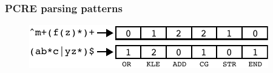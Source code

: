 {\begin{frame}

\end{frame}
}


%



 \begin{frame}
 \frametitle{PCRE parsing patterns}
 \begin{figure}[h]
   \centering
   \includegraphics[scale=1.25]{nontex/illustrations/featureParsing.pdf}
   \label{fig:featureParsing}
 \end{figure}
 \begin{center}
 \begin{Large}
 \end{Large}
 \end{center}
 \end{frame}



